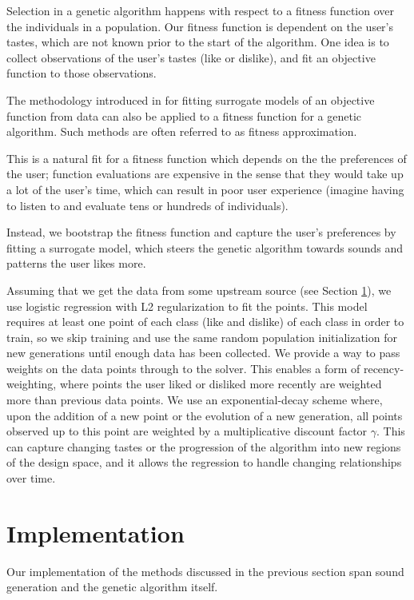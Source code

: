 \documentclass[conference]{IEEEtran}
\begin{document}
Selection in a genetic algorithm happens with respect to a fitness function
over the individuals in a population. Our fitness function is dependent on the
user's tastes, which are not known prior to the start of the algorithm. One
idea is to collect observations of the user's tastes (like or dislike), and fit
an objective function to those observations.

The methodology introduced in \cite{textbook} for fitting surrogate
models of an objective function from data can also be applied to a fitness
function for a genetic algorithm. Such methods are often referred to as fitness
approximation.

This is a natural fit for a fitness function which depends on the the
preferences of the user; function evaluations are expensive in the sense that
they would take up a lot of the user's time, which can result in poor user
experience (imagine having to listen to and evaluate tens or hundreds of
individuals).

Instead, we bootstrap the fitness function and capture the user's preferences
by fitting a surrogate model, which steers the genetic algorithm towards sounds
and patterns the user likes more.

Assuming that we get the data from some upstream source (see Section
\ref{implementation}), we use logistic regression with L2 regularization to
fit the points. This model requires at least one point of each class (like and
dislike) of each class in order to train, so we skip training and use the same
random population initialization for new generations until enough data has been
collected. We provide a way to pass weights on the data points through to the
solver. This enables a form of recency-weighting, where points the user liked
or disliked more recently are weighted more than previous data points. We use
an exponential-decay scheme where, upon the addition of a new point or the
evolution of a new generation, all points observed up to this point are
weighted by a multiplicative discount factor $\gamma$. This can
capture changing tastes or the progression of the algorithm into new regions of
the design space, and it allows the regression to handle changing relationships
over time.

\section{Implementation}\label{implementation}
Our implementation of the methods discussed in the previous section span sound
generation and the genetic algorithm itself.
\end{document}
